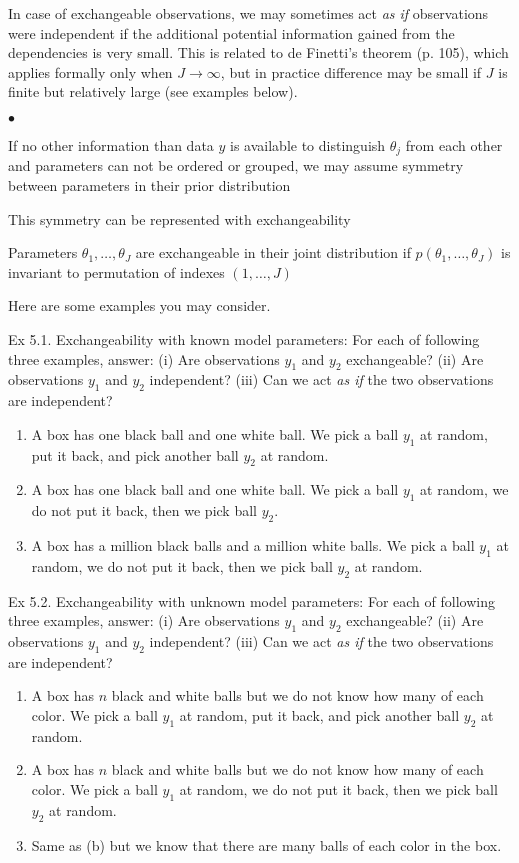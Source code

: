 \documentclass[a4paper,11pt,english]{article}
\begin{document}
In case of exchangeable observations, we may sometimes act \emph{as
  if} observations were independent if the additional potential
information gained from the dependencies is very small. This is
related to de Finetti's theorem (p. 105), which applies formally
only when $J\rightarrow\infty$, but in practice difference may be
small if $J$ is finite but relatively large (see examples below).

\begin{list}{$\bullet$}{\itemsep=0pt\parsep=4pt\topsep=4pt}
\item If no other information than data $y$ is available to distinguish
  $\theta_j$ from each other and parameters can not be ordered or
  grouped, we may assume symmetry between parameters in their prior
  distribution
\item This symmetry can be represented with exchangeability
\item Parameters $\theta_1,\ldots,\theta_J$ are exchangeable
  in their joint distribution if $p(\theta_1,\ldots,\theta_J)$ is
  invariant to permutation of indexes  $(1,\ldots,J)$ 
\end{list}

Here are some examples you may consider. 

Ex 5.1. Exchangeability with known model parameters: For each of following three examples, answer: (i) Are observations $y_1$ and $y_2$ exchangeable? (ii) Are observations $y_1$ and $y_2$ independent? (iii) Can we act {\em as if} the two observations are independent?
\begin{enumerate}
\item A box has one black ball and one white ball.  We pick a ball $y_1$ at random, put it back, and pick another ball $y_2$ at random.
\item A box has one black ball and one white ball.   We pick a ball
  $y_1$ at random, we do not put it back, then we pick ball
   $y_2$.
\item A box has a million black balls and a million white balls.  We
  pick a ball $y_1$ at random, we do not put it back, then we pick ball
   $y_2$ at random.
\end{enumerate}

Ex 5.2. Exchangeability with unknown model parameters: For each of following
three examples, answer: (i) Are observations $y_1$ and $y_2$
exchangeable? (ii) Are observations $y_1$ and $y_2$ independent? (iii)
Can we act {\em as if} the two observations are independent?
\begin{enumerate}
\item A box has $n$ black and white balls but we do not know how many of each color.
We pick a ball $y_1$ at random, put it back, and pick another ball $y_2$ at random.
\item A box has $n$ black and white balls but we do not know how many of each color.  We pick a ball
  $y_1$ at random, we do not put it back, then we pick ball
   $y_2$ at random.
\item Same as (b) but we know that there are many balls of each color in the box.
\end{enumerate}
\end{document}

